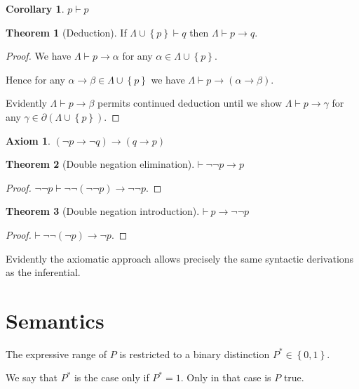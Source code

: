 \documentclass{amsbook}
\newcommand{\setsm}[1]{\left\{#1\right\}}
\newcommand{\infers}{\mathrel\vdash}
\newcommand{\theorem}{\mathord\vdash\medspace}
\newcommand{\then}{\mathrel\rightarrow}
\theoremstyle{definition}
\newtheorem{axm}{Axiom}[chapter]
\newtheorem{thm}{Theorem}[section]
\newtheorem{crl}{Corollary}[section]
\begin{document}
\begin{crl}
    $p \infers p$
\end{crl}

\begin{thm}[Deduction]
    If $\varLambda \cup \setsm p \infers q$ then $\varLambda \infers p \then q$.
    \begin{proof}
        We have $\varLambda \infers p \then \alpha$ for any $\alpha \in \varLambda \cup \setsm p$.

        Hence for any $\alpha \then \beta \in \varLambda \cup \setsm p$ we have $\varLambda \infers p \then (\alpha \then \beta)$.

        Evidently $\varLambda \infers p \then \beta$ permits continued deduction until we show $\varLambda \infers p \then \gamma$ for any $\gamma \in \partial(\varLambda \cup \setsm p)$.
    \end{proof}
\end{thm}

\begin{axm}
    $(\neg p \then \neg q) \then (q \then p)$
\end{axm}

\begin{thm}[Double negation elimination]
    $\theorem \neg\neg p \then p$
    \begin{proof}
        $\neg\neg p \infers \neg\neg(\neg\neg p) \then \neg\neg p$.
    \end{proof}
\end{thm}

\begin{thm}[Double negation introduction]
    $\theorem p \then \neg\neg p$
    \begin{proof}
        $\theorem \neg\neg(\neg p) \then \neg p$.
    \end{proof}
\end{thm}

Evidently the axiomatic approach allows precisely the same syntactic derivations as the inferential.


\section{Semantics}

The expressive range of $P$ is restricted to a binary distinction $P^* \in \setsm{0,1}$.

We say that $P^*$ is the case only if $P^* = 1$. Only in that case is $P$ true.
\end{document}
